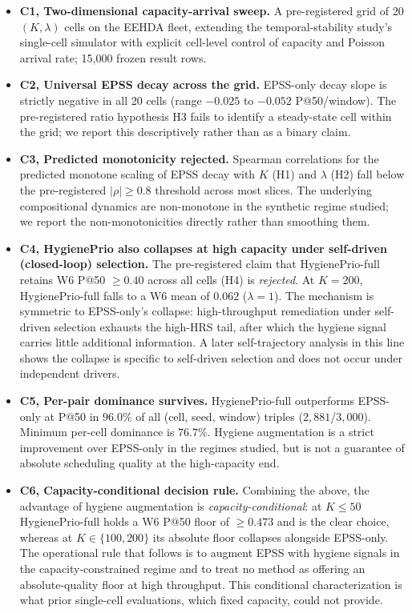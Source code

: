 \begin{itemize}
\item \textbf{C1, Two-dimensional capacity-arrival sweep.} A
pre-registered grid of 20 $(K, \lambda)$ cells on the EEHDA fleet,
extending the temporal-stability study's single-cell simulator with explicit cell-level
control of capacity and Poisson arrival rate; 15{,}000 frozen result rows.

\item \textbf{C2, Universal EPSS decay across the grid.} EPSS-only
decay slope is strictly negative in all 20 cells (range $-0.025$ to
$-0.052$ P@50/window). The pre-registered ratio hypothesis H3 fails to
identify a steady-state cell within the grid; we report this descriptively
rather than as a binary claim.

\item \textbf{C3, Predicted monotonicity rejected.} Spearman
correlations for the predicted monotone scaling of EPSS decay with $K$
(H1) and $\lambda$ (H2) fall below the pre-registered $|\rho| \geq 0.8$
threshold across most slices. The underlying compositional dynamics
are non-monotone in the synthetic regime studied; we report the
non-monotonicities directly rather than smoothing them.

\item \textbf{C4, HygienePrio also collapses at high capacity
under self-driven (closed-loop) selection.}
The pre-registered claim that HygienePrio-full retains W6 P@50
$\geq 0.40$ across all cells (H4) is \textit{rejected}. At $K = 200$,
HygienePrio-full falls to a W6 mean of $0.062$ ($\lambda = 1$). The
mechanism is symmetric to EPSS-only's collapse: high-throughput
remediation under self-driven selection exhausts the high-HRS tail,
after which the hygiene signal carries little additional information.
A later self-trajectory analysis in this line shows the collapse is specific to
self-driven selection and does not occur under independent drivers.

\item \textbf{C5, Per-pair dominance survives.} HygienePrio-full
outperforms EPSS-only at P@50 in $96.0\%$ of all (cell, seed, window)
triples ($2{,}881$/$3{,}000$). Minimum per-cell dominance is $76.7\%$.
Hygiene augmentation is a strict improvement over EPSS-only in the
regimes studied, but is not a guarantee of absolute scheduling quality
at the high-capacity end.

\item \textbf{C6, Capacity-conditional decision rule.} Combining the
above, the advantage of hygiene augmentation is \emph{capacity-conditional}:
at $K \leq 50$ HygienePrio-full holds a W6 P@50 floor of $\geq 0.473$
and is the clear choice, whereas at $K \in \{100, 200\}$ its absolute
floor collapses alongside EPSS-only. The operational rule that follows
is to augment EPSS with hygiene signals in the capacity-constrained
regime and to treat no method as offering an absolute-quality floor at
high throughput. This conditional characterization is what prior
single-cell evaluations, which fixed capacity, could not provide.
\end{itemize}

